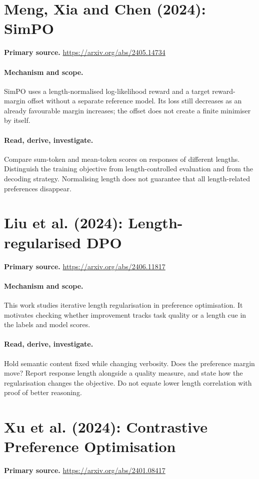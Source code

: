 \documentclass[11pt]{scrartcl}
\begin{document}
\section{Meng, Xia and Chen (2024): SimPO}
\noindent\textbf{Primary source.} \url{https://arxiv.org/abs/2405.14734}

\paragraph{Mechanism and scope.} SimPO uses a length-normalised log-likelihood reward and a target reward-margin offset without a separate reference model. Its loss still decreases as an already favourable margin increases; the offset does not create a finite minimiser by itself.

\paragraph{Read, derive, investigate.} Compare sum-token and mean-token scores on responses of different lengths. Distinguish the training objective from length-controlled evaluation and from the decoding strategy. Normalising length does not guarantee that all length-related preferences disappear.

\section{Liu et al. (2024): Length-regularised DPO}
\noindent\textbf{Primary source.} \url{https://arxiv.org/abs/2406.11817}

\paragraph{Mechanism and scope.} This work studies iterative length regularisation in preference optimisation. It motivates checking whether improvement tracks task quality or a length cue in the labels and model scores.

\paragraph{Read, derive, investigate.} Hold semantic content fixed while changing verbosity. Does the preference margin move? Report response length alongside a quality measure, and state how the regularisation changes the objective. Do not equate lower length correlation with proof of better reasoning.

\section{Xu et al. (2024): Contrastive Preference Optimisation}
\noindent\textbf{Primary source.} \url{https://arxiv.org/abs/2401.08417}
\end{document}
